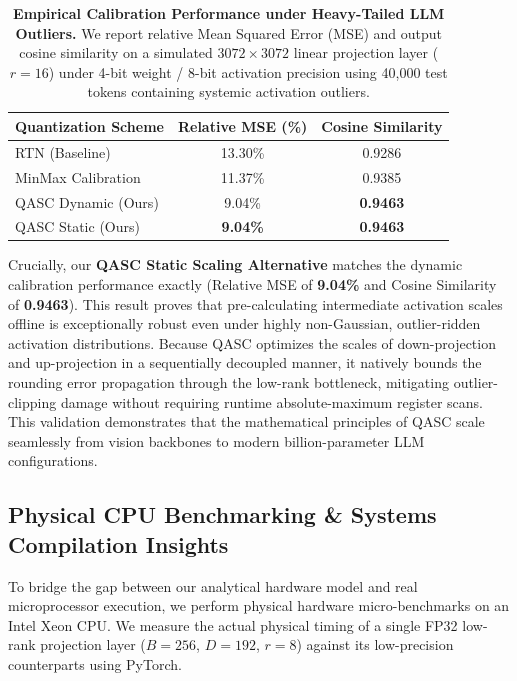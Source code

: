 \begin{table}[h]
\caption{\textbf{Empirical Calibration Performance under Heavy-Tailed LLM Outliers.} We report relative Mean Squared Error (MSE) and output cosine similarity on a simulated $3072 \times 3072$ linear projection layer ($r=16$) under 4-bit weight / 8-bit activation precision using 40,000 test tokens containing systemic activation outliers.}
\label{tab:llm_outliers}
\vskip 0.1in
\begin{center}
\begin{scriptsize}
\begin{sc}
\setlength{\tabcolsep}{1.5pt}
\begin{tabular}{lcc}
\toprule
Quantization Scheme & Relative MSE (\%) & Cosine Similarity \\
\midrule
RTN (Baseline) & 13.30\% & 0.9286 \\
MinMax Calibration & 11.37\% & 0.9385 \\
QASC Dynamic (Ours) & 9.04\% & \textbf{0.9463} \\
QASC Static (Ours) & \textbf{9.04\%} & \textbf{0.9463} \\
\bottomrule
\end{tabular}
\end{sc}
\end{scriptsize}
\end{center}
\vskip -0.1in
\end{table}

Crucially, our \textbf{QASC Static Scaling Alternative} matches the dynamic calibration performance exactly (Relative MSE of \textbf{9.04\%} and Cosine Similarity of \textbf{0.9463}). This result proves that pre-calculating intermediate activation scales offline is exceptionally robust even under highly non-Gaussian, outlier-ridden activation distributions. Because QASC optimizes the scales of down-projection and up-projection in a sequentially decoupled manner, it natively bounds the rounding error propagation through the low-rank bottleneck, mitigating outlier-clipping damage without requiring runtime absolute-maximum register scans. This validation demonstrates that the mathematical principles of QASC scale seamlessly from vision backbones to modern billion-parameter LLM configurations.

\subsection{Physical CPU Benchmarking \& Systems Compilation Insights}
\label{sec:physical_benchmarks}
To bridge the gap between our analytical hardware model and real microprocessor execution, we perform physical hardware micro-benchmarks on an Intel Xeon CPU. We measure the actual physical timing of a single FP32 low-rank projection layer ($B=256$, $D=192$, $r=8$) against its low-precision counterparts using PyTorch. 

